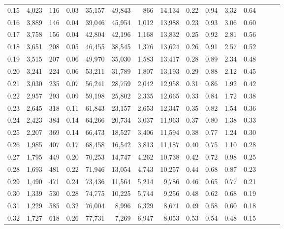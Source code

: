 \begin{tabular}{rrrrrrrrrrrrrrr}
0.15 &  4,023 &  116 &  0.03 &  35,157 &  49,843 &     866 &  14,134 &  0.22 &  0.94 &  3.32 &      0.64 \\
0.16 &  3,889 &  146 &  0.04 &  39,046 &  45,954 &   1,012 &  13,988 &  0.23 &  0.93 &  3.06 &      0.60 \\
0.17 &  3,758 &  156 &  0.04 &  42,804 &  42,196 &   1,168 &  13,832 &  0.25 &  0.92 &  2.81 &      0.56 \\
0.18 &  3,651 &  208 &  0.05 &  46,455 &  38,545 &   1,376 &  13,624 &  0.26 &  0.91 &  2.57 &      0.52 \\
0.19 &  3,515 &  207 &  0.06 &  49,970 &  35,030 &   1,583 &  13,417 &  0.28 &  0.89 &  2.34 &      0.48 \\
0.20 &  3,241 &  224 &  0.06 &  53,211 &  31,789 &   1,807 &  13,193 &  0.29 &  0.88 &  2.12 &      0.45 \\
0.21 &  3,030 &  235 &  0.07 &  56,241 &  28,759 &   2,042 &  12,958 &  0.31 &  0.86 &  1.92 &      0.42 \\
0.22 &  2,957 &  293 &  0.09 &  59,198 &  25,802 &   2,335 &  12,665 &  0.33 &  0.84 &  1.72 &      0.38 \\
0.23 &  2,645 &  318 &  0.11 &  61,843 &  23,157 &   2,653 &  12,347 &  0.35 &  0.82 &  1.54 &      0.36 \\
0.24 &  2,423 &  384 &  0.14 &  64,266 &  20,734 &   3,037 &  11,963 &  0.37 &  0.80 &  1.38 &      0.33 \\
0.25 &  2,207 &  369 &  0.14 &  66,473 &  18,527 &   3,406 &  11,594 &  0.38 &  0.77 &  1.24 &      0.30 \\
0.26 &  1,985 &  407 &  0.17 &  68,458 &  16,542 &   3,813 &  11,187 &  0.40 &  0.75 &  1.10 &      0.28 \\
0.27 &  1,795 &  449 &  0.20 &  70,253 &  14,747 &   4,262 &  10,738 &  0.42 &  0.72 &  0.98 &      0.25 \\
0.28 &  1,693 &  481 &  0.22 &  71,946 &  13,054 &   4,743 &  10,257 &  0.44 &  0.68 &  0.87 &      0.23 \\
0.29 &  1,490 &  471 &  0.24 &  73,436 &  11,564 &   5,214 &   9,786 &  0.46 &  0.65 &  0.77 &      0.21 \\
0.30 &  1,339 &  530 &  0.28 &  74,775 &  10,225 &   5,744 &   9,256 &  0.48 &  0.62 &  0.68 &      0.19 \\
0.31 &  1,229 &  585 &  0.32 &  76,004 &   8,996 &   6,329 &   8,671 &  0.49 &  0.58 &  0.60 &      0.18 \\
0.32 &  1,727 &  618 &  0.26 &  77,731 &   7,269 &   6,947 &   8,053 &  0.53 &  0.54 &  0.48 &      0.15 \\

\end{tabular}
